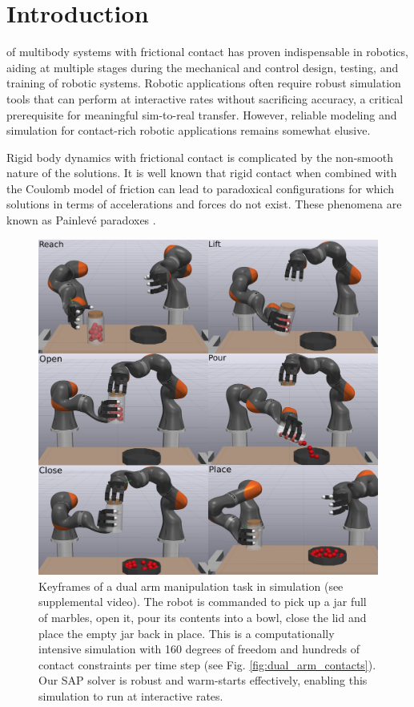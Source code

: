 \section{Introduction}
\label{sec:introduction}

 of multibody systems with frictional contact has
proven indispensable in robotics, aiding at multiple stages during the
mechanical and control design, testing, and training of robotic systems.
Robotic applications often require robust simulation tools that can perform at
interactive rates without sacrificing accuracy, a critical prerequisite for
meaningful sim-to-real transfer. However, reliable modeling and simulation
for contact-rich robotic applications remains somewhat elusive.

Rigid body dynamics with frictional contact is complicated by the non-smooth
nature of the solutions. It is well known \cite{bib:baraff1993issues} that rigid
contact when combined with the Coulomb model of friction can lead to paradoxical
configurations for which solutions in terms of accelerations and forces do not
exist. These phenomena are known as Painlev\'e paradoxes
\cite{bib:hogan2017regularization}.
%
\begin{figure}[!ht]
	\centering
    \includegraphics[width=0.95\columnwidth]{figures/dual_arm/tiled.png}
	\caption{\label{fig:dual_arm_frames}
    Keyframes of a dual arm manipulation task in simulation (see supplemental
    video). The robot is commanded to pick up a jar full of marbles, open it,
    pour its contents into a bowl, close the lid and place the empty jar back in
    place. This is a computationally intensive simulation with 160 degrees of
    freedom and hundreds of contact constraints per time step (see Fig.
    \ref{fig:dual_arm_contacts}). Our SAP solver is robust and warm-starts
    effectively, enabling this simulation to run at interactive rates.}
\end{figure}
